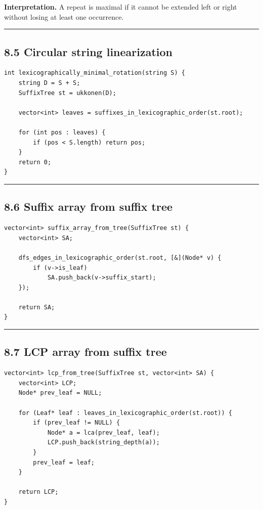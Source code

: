 \documentclass[11pt]{article}
\begin{document}
\textbf{Interpretation.} A repeat is maximal if it cannot be extended left or right without losing at least one occurrence.

\begin{center}\rule{0.5\linewidth}{0.5pt}\end{center}

\subsection{8.5 Circular string linearization}\label{circular-string-linearization}

\begin{verbatim}
int lexicographically_minimal_rotation(string S) {
    string D = S + S;
    SuffixTree st = ukkonen(D);

    vector<int> leaves = suffixes_in_lexicographic_order(st.root);

    for (int pos : leaves) {
        if (pos < S.length) return pos;
    }
    return 0;
}
\end{verbatim}

\begin{center}\rule{0.5\linewidth}{0.5pt}\end{center}

\subsection{8.6 Suffix array from suffix tree}\label{suffix-array-from-suffix-tree}

\begin{verbatim}
vector<int> suffix_array_from_tree(SuffixTree st) {
    vector<int> SA;

    dfs_edges_in_lexicographic_order(st.root, [&](Node* v) {
        if (v->is_leaf)
            SA.push_back(v->suffix_start);
    });

    return SA;
}
\end{verbatim}

\begin{center}\rule{0.5\linewidth}{0.5pt}\end{center}

\subsection{8.7 LCP array from suffix tree}\label{lcp-array-from-suffix-tree}

\begin{verbatim}
vector<int> lcp_from_tree(SuffixTree st, vector<int> SA) {
    vector<int> LCP;
    Node* prev_leaf = NULL;

    for (Leaf* leaf : leaves_in_lexicographic_order(st.root)) {
        if (prev_leaf != NULL) {
            Node* a = lca(prev_leaf, leaf);
            LCP.push_back(string_depth(a));
        }
        prev_leaf = leaf;
    }

    return LCP;
}
\end{verbatim}
\end{document}
